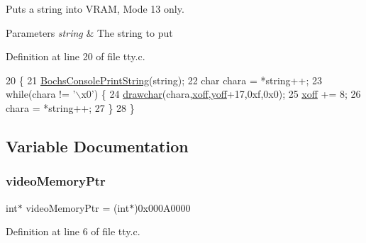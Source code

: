 Puts a string into V\+R\+AM, Mode 13 only. 


\begin{DoxyParams}{Parameters}
{\em string} & The string to put \\
\hline
\end{DoxyParams}


Definition at line 20 of file tty.\+c.


\begin{DoxyCode}
20                                     \{
21     \hyperlink{a00029_a19e1f554d03c977f8b947f21489daa41_a19e1f554d03c977f8b947f21489daa41}{BochsConsolePrintString}(\textcolor{keywordtype}{string});
22     \textcolor{keywordtype}{char} chara = *\textcolor{keywordtype}{string}++;
23     \textcolor{keywordflow}{while}(chara != \textcolor{stringliteral}{'\(\backslash\)x0'}) \{
24         \hyperlink{a00014_a2c8df7a20b47341b70d97a7ff21d86ea_a2c8df7a20b47341b70d97a7ff21d86ea}{drawchar}(chara,\hyperlink{a00107_abaa0d20f0e52ce0d3a7d706f6ac16266_abaa0d20f0e52ce0d3a7d706f6ac16266}{xoff},\hyperlink{a00107_a1a7539764d0ae8cd06ce45c62cf92bca_a1a7539764d0ae8cd06ce45c62cf92bca}{yoff}+17,0xf,0x0);
25         \hyperlink{a00107_abaa0d20f0e52ce0d3a7d706f6ac16266_abaa0d20f0e52ce0d3a7d706f6ac16266}{xoff} += 8;
26         chara = *\textcolor{keywordtype}{string}++;
27     \}
28 \}
\end{DoxyCode}


\subsection{Variable Documentation}
\mbox{\label{a00107_a3f896e9c00b9302e2287aad054199134_a3f896e9c00b9302e2287aad054199134}} 
\subsubsection{\texorpdfstring{video\+Memory\+Ptr}{videoMemoryPtr}}
{\footnotesize\ttfamily int$\ast$ video\+Memory\+Ptr = (int$\ast$)0x000\+A0000}



Definition at line 6 of file tty.\+c.

\mbox{\label{a00107_abaa0d20f0e52ce0d3a7d706f6ac16266_abaa0d20f0e52ce0d3a7d706f6ac16266}} 
